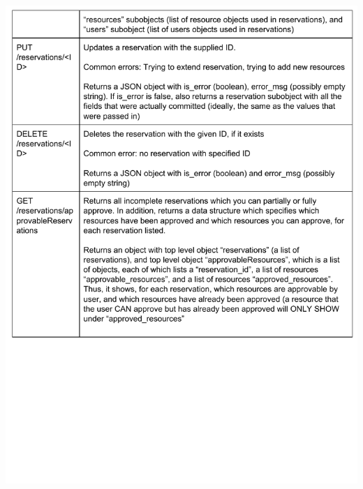 \documentclass[12pt]{article}
\begin{document}
\includegraphics[width=6in]{../ev3/apispec_03.pdf}
\end{document}
